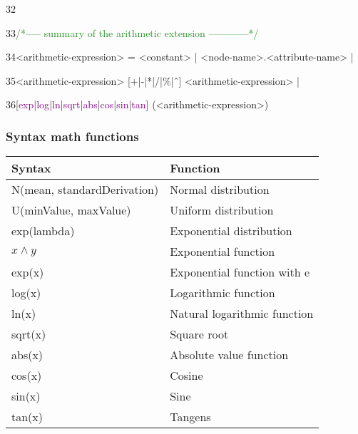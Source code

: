 {32




33\hspace{0.5cm}\textcolor{ForestGreen}{/*----- summary of the arithmetic extension ------------*/}

34\hspace{0.5cm}<arithmetic-expression> = <constant> | <node-name>.<attribute-name> |

35\hspace{0.5cm}<arithmetic-expression> [+|-|*|/|\%|ˆ] <arithmetic-expression> |

36\hspace{0.5cm}[\textcolor{Purple}{exp}|\textcolor{Purple}{log}|\textcolor{Purple}{ln}|\textcolor{Purple}{sqrt}|\textcolor{Purple}{abs}|\textcolor{Purple}{cos}|\textcolor{Purple}{sin}|\textcolor{Purple}{tan}] (<arithmetic-expression>)

}

\clearpage

\subsubsection{Syntax math functions}

{
\begin{center}
\begin{tabular}{ | m{4cm} | m{4cm} |  }
\hline
\textbf{Syntax} & \textbf{Function} \\
\hline
N(mean, standardDerivation) & Normal distribution  \\
\hline
U(minValue, maxValue) & Uniform distribution  \\
\hline
exp(lambda) & Exponential distribution \\
\hline
$x \wedge y$ & Exponential function \\
\hline
exp(x) & Exponential function with e \\
\hline
log(x) & Logarithmic function \\
\hline
ln(x) & Natural logarithmic function \\
\hline
sqrt(x) & Square root \\
\hline
abs(x) & Absolute value function \\
\hline
cos(x) & Cosine \\
\hline
sin(x) & Sine \\
\hline
tan(x) & Tangens \\
\hline

\end{tabular}
\end{center}
}

\clearpage
